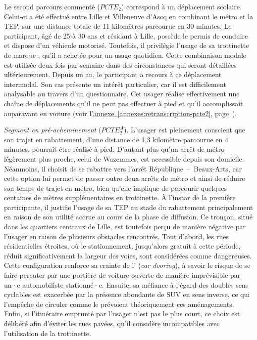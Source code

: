 \begin{refsegment}
Le second parcours commenté (\(PCTE_{2}\)) correspond à un déplacement scolaire. Celui-ci a été effectué entre Lille et Villeneuve d’Ascq en combinant le métro et la \acrshort{TEP}, sur une distance totale de 11 kilomètres parcourue en 30 minutes. Le participant, âgé de 25 à 30 ans et résidant à Lille, possède le permis de conduire et dispose d’un véhicule motorisé. Toutefois, il privilégie l’usage de sa trottinette de marque , qu’il a achetée pour un usage quotidien. Cette combinaison modale est utilisée deux fois par semaine dans des circonstances qui seront détaillées ultérieurement. Depuis un an, le participant a recours à ce déplacement intermodal. Son cas présente un intérêt particulier, car il est difficilement analysable au travers d'un questionnaire. Cet usager réalise effectivement une chaîne de déplacements qu’il ne peut pas effectuer à pied et qu’il accomplissait auparavant en voiture (voir l'\hyperref[annexes:retranscription-pcte2]{annexe~\ref{annexes:retranscription-pcte2}}, page~\pageref{annexes:retranscription-pcte2}).%

\textsl{Segment en pré-acheminement} (\(PCTE^{A}_{2}\)). L’usager est pleinement conscient que son trajet en rabattement, d’une distance de 1,3 kilomètre parcourue en 4 minutes, pourrait être réalisé à pied. D’autant plus qu’un arrêt de métro légèrement plus proche, celui de Wazemmes, est accessible depuis son domicile. Néanmoins, il choisit de se rabattre vers l’arrêt République~–~Beaux-Arts, car cette option lui permet de passer outre deux arrêts de métro et ainsi de réduire son temps de trajet en métro, bien qu’elle implique de parcourir quelques centaines de mètres supplémentaires en trottinette. À l’instar de la première participante, il justifie l’usage de sa \acrshort{TEP} au stade du rabattement principalement en raison de son utilité accrue au cours de la phase de diffusion. Ce tronçon, situé dans les quartiers centraux de Lille, est toutefois perçu de manière négative par l’usager en raison de plusieurs obstacles rencontrés. Tout d’abord, les rues résidentielles étroites, où le stationnement, jusqu’alors gratuit à cette période, réduit significativement la largeur des voies, sont considérées comme dangereuses. Cette configuration renforce sa crainte de l’ (\textsl{car dooring}), à savoir le risque de se faire percuter par une portière de voiture ouverte de manière imprévisible par un·e automobiliste stationné·e. Ensuite, sa méfiance à l’égard des doubles sens cyclables est exacerbée par la présence abondante de \acrshort{SUV} en sens inverse, ce qui l’empêche de circuler comme le prévoient théoriquement ces aménagements. Enfin, si l’itinéraire emprunté par l’usager n'est pas le plus court, ce choix est délibéré afin d’éviter les rues pavées, qu’il considère incompatibles avec l’utilisation de la trottinette.%


\end{refsegment}
